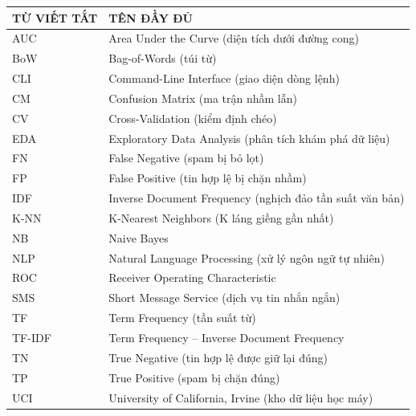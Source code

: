 
\begin{longtable}{|p{4cm}|p{10cm}|}
\hline
\centering\textbf{TỪ VIẾT TẮT} & \centering\arraybackslash\textbf{TÊN ĐẦY ĐỦ} \\
\hline
\endhead
AUC & Area Under the Curve (diện tích dưới đường cong) \\
\hline
BoW & Bag-of-Words (túi từ) \\
\hline
CLI & Command-Line Interface (giao diện dòng lệnh) \\
\hline
CM & Confusion Matrix (ma trận nhầm lẫn) \\
\hline
CV & Cross-Validation (kiểm định chéo) \\
\hline
EDA & Exploratory Data Analysis (phân tích khám phá dữ liệu) \\
\hline
FN & False Negative (spam bị bỏ lọt) \\
\hline
FP & False Positive (tin hợp lệ bị chặn nhầm) \\
\hline
IDF & Inverse Document Frequency (nghịch đảo tần suất văn bản) \\
\hline
K-NN & K-Nearest Neighbors (K láng giềng gần nhất) \\
\hline
NB & Naive Bayes \\
\hline
NLP & Natural Language Processing (xử lý ngôn ngữ tự nhiên) \\
\hline
ROC & Receiver Operating Characteristic \\
\hline
SMS & Short Message Service (dịch vụ tin nhắn ngắn) \\
\hline
TF & Term Frequency (tần suất từ) \\
\hline
TF-IDF & Term Frequency -- Inverse Document Frequency \\
\hline
TN & True Negative (tin hợp lệ được giữ lại đúng) \\
\hline
TP & True Positive (spam bị chặn đúng) \\
\hline
UCI & University of California, Irvine (kho dữ liệu học máy) \\
\hline
\end{longtable}
